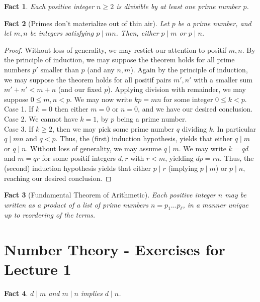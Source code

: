 \documentclass[12pt]{article}
\newtheorem*{fact*}{Fact}
\begin{document}
\begin{fact*}
Each positive integer $n\ge 2$ is divisible by at least one prime number $p$.
\end{fact*}


\begin{fact*}[Primes don't materialize out of thin air]
Let $p$ be a prime number, and let $m,n$ be integers satisfying $p\mid mn$. Then, either $p\mid m$ or $p\mid n$.
\end{fact*}


\begin{proof}
Without loss of generality, we may restict our attention to positif $m,n$.
By the principle of induction, we may suppose the theorem holds for all prime numbers $p'$ smaller than $p$ (and any $n,m$). Again by the principle of induction, we may suppose the theorem holds for all positif pairs $m',n'$ with a smaller sum $m' + n' < m + n$ (and our fixed $p$).
Applying division with remainder, we may suppose $0 \le m,n < p$. 
We may now write $kp=mn$ for some integer $0 \le k < p$. \\
Case 1. If $k = 0$ then either $m=0$ or $n=0$, and we have our desired conclusion. \\
Case 2. We cannot have $k=1$, by $p$ being a prime number. \\
Case 3. If $k\ge 2$, then we may pick some prime number $q$ dividing $k$. In particular $q \mid mn$ and $q < p$. Thus, the (first) induction hypothesis, yields that either $q\mid m$ or $q\mid n$. Without loss of generality, we may assume $q\mid m$. We may write $k=qd$ and $m=qr$ for some positif integers $d,r$ with $r < m$, yielding $dp=rn$. Thus, the (second) induction hypothesis yields that either $p\mid r$ (implying $p\mid m$) or $p\mid n$, reaching our desired conclusion.
\end{proof}


\begin{fact*}[Fundamental Theorem of Arithmetic]
Each positive integer $n$ may be written as a product of a list of prime numbers $n=p_1\dots p_\ell$, in a manner unique up to reordering of the terms.
\end{fact*}


\newpage
\section{Number Theory - Exercises for Lecture 1}


\begin{fact*}
$d \mid m$ and $m \mid n$ implies $d\mid n$.
\end{fact*}
\end{document}
